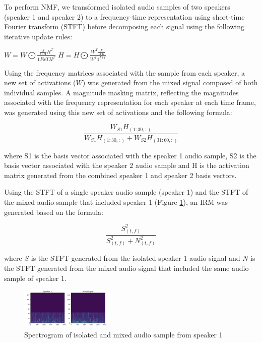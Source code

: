 \documentclass[journal, a4paper]{IEEEtran}
\begin{document}
To perform NMF, we transformed isolated audio samples of two speakers (speaker 1 and speaker 2) to a frequency-time representation using short-time Fourier transform (STFT) before decomposing each signal using the following iterative update rules:
\newline

$W = W \bigodot \frac{\frac{X}{WH}H^T}{1{FxT}H^T}$ \hspace{1cm} $H = H \bigodot \frac{W^T\frac{X}{WH}}{W^T1^{FxT}}$
\newline

Using the frequency matrices associated with the sample from each speaker, a new set of activations ($W$) was generated from the mixed signal composed of both individual samples. A magnitude masking matrix, reflecting the magnitudes associated with the frequency representation for each speaker at each time frame, was generated using this new set of activations and the following formula:


\[
\dfrac{W_{S1}H_{(1:30,:)}}
{W_{S1}H_{(1:30,:)}+W_{S2}H_{(31:60,:)}}
\]

\begin{flushleft}
where S1 is the basis vector associated with the speaker 1 audio sample, S2 is the basis vector associated with the speaker 2 audio sample and H is the activation matrix generated from the combined speaker 1 and speaker 2 basis vectors.\cite{ClassNMF}
\end{flushleft}

Using the STFT of a single speaker audio sample (speaker 1) and the STFT of the mixed audio sample that included speaker 1 (Figure \ref{fig:spec_speaker_1}), an IRM was generated based on the formula:

\[
\dfrac{S_{(t,f)}^2}{S_{(t,f)}^2 + N_{(t,f)}^2}
\]

\begin{flushleft}

where $S$ is the STFT generated from the isolated speaker 1 audio signal and $N$ is the STFT generated from the mixed audio signal that included the same audio sample of speaker 1.\cite{DBLP:journals/corr/abs-1708-07524}

\end{flushleft}

\begin{figure}[h!]
    \centering  
     \caption{\label{fig:spec_speaker_1}Spectrogram of isolated and mixed audio sample from speaker 1}  
    \includegraphics[width=0.4\textwidth]{cIRM_same.png}  
\end{figure}
\end{document}
